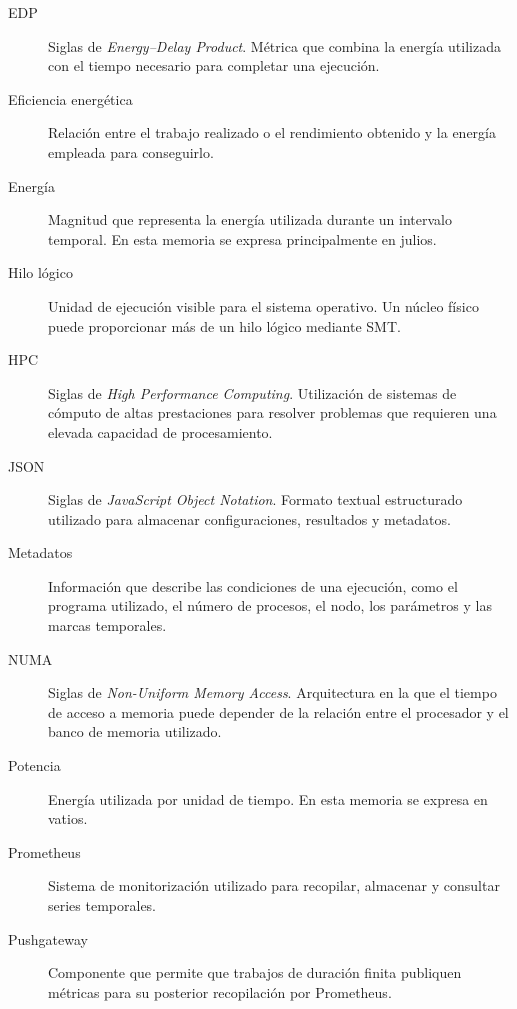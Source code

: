 \begin{description}
    \item[EDP]
    Siglas de \textit{Energy--Delay Product}. Métrica que combina la energía utilizada con el tiempo necesario para completar una ejecución.

    \item[Eficiencia energética]
    Relación entre el trabajo realizado o el rendimiento obtenido y la energía empleada para conseguirlo.

    \item[Energía]
    Magnitud que representa la energía utilizada durante un intervalo temporal. En esta memoria se expresa principalmente en julios.

    \item[Hilo lógico]
    Unidad de ejecución visible para el sistema operativo. Un núcleo físico puede proporcionar más de un hilo lógico mediante SMT.

    \item[HPC]
    Siglas de \textit{High Performance Computing}. Utilización de sistemas de cómputo de altas prestaciones para resolver problemas que requieren una elevada capacidad de procesamiento.

    \item[JSON]
    Siglas de \textit{JavaScript Object Notation}. Formato textual estructurado utilizado para almacenar configuraciones, resultados y metadatos.

    \item[Metadatos]
    Información que describe las condiciones de una ejecución, como el programa utilizado, el número de procesos, el nodo, los parámetros y las marcas temporales.

    \item[NUMA]
    Siglas de \textit{Non-Uniform Memory Access}. Arquitectura en la que el tiempo de acceso a memoria puede depender de la relación entre el procesador y el banco de memoria utilizado.

    \item[Potencia]
    Energía utilizada por unidad de tiempo. En esta memoria se expresa en vatios.

    \item[Prometheus]
    Sistema de monitorización utilizado para recopilar, almacenar y consultar series temporales.

    \item[Pushgateway]
    Componente que permite que trabajos de duración finita publiquen métricas para su posterior recopilación por Prometheus.


\end{description}
